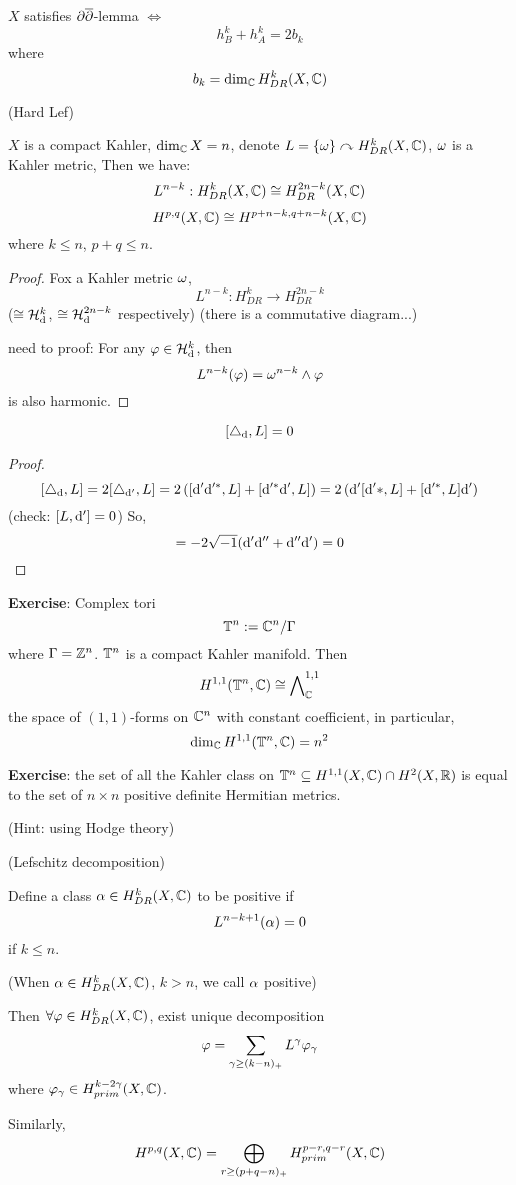 \begin{thm}
$X$ satisfies $\partial\overline{\partial}$-lemma $\iff$
$$h_B^k+h_A^k=2b_k$$
where
$$b_k=\dim_{\mathbb{C}} H_{DR}^k(X,\mathbb{C})$$
\end{thm}

\begin{thm}(Hard Lef)

$X$ is a compact Kahler, $\dim_{\mathbb{C}} X=n$, denote
$L=\{\omega\}\curvearrowright H_{DR}^k(X,\mathbb{C})$, $\omega$ is a Kahler metric,
Then we have:
$$L^{n-k}: H_{DR}^k(X,\mathbb{C})\cong H_{DR}^{2n-k}(X,\mathbb{C})$$
$$H^{p,q}(X,\mathbb{C})\cong H^{p+n-k,q+n-k}(X,\mathbb{C})$$
where $k\leq n$, $p+q\leq n$.
\end{thm}

\begin{proof}Fox a Kahler metric $\omega$,
$$L^{n-k}:H_{DR}^k\to H_{DR}^{2n-k}$$
($\cong \mathcal{H}_{\mathrm{d}}^k$, $\cong\mathcal{H}_{\mathrm{d}}^{2n-k}$ respectively)
(there is a commutative diagram...)

need to proof: For any $\varphi\in\mathcal{H}_{\mathrm{d}}^k$, then
$$L^{n-k}(\varphi)=\omega^{n-k}\wedge\varphi$$
is also harmonic.
\end{proof}

\begin{lemma}
$$[\triangle_{\mathrm{d}},L]=0$$
\end{lemma}

\begin{proof}
$$[\triangle_{\mathrm{d}},L]=2[\triangle_{\mathrm{d}'},L]
=2\left([\mathrm{d}'\mathrm{d}'^*,L]+[\mathrm{d}'^*\mathrm{d}',L]\right)
=2\left(\mathrm{d}'[\mathrm{d}'*,L]+[\mathrm{d}'^*,L]\mathrm{d}'\right)$$
(check: $[L,\mathrm{d}']=0$)
So,
$$=-2\sqrt{-1}(\mathrm{d}'\mathrm{d}''+\mathrm{d}''\mathrm{d}')=0$$
\end{proof}

\textbf{Exercise}: Complex tori
$$\mathbb{T}^n:=\mathbb{C}^n/\Gamma$$
where $\Gamma=\mathbb{Z}^n$. $\mathbb{T}^n$ is a compact Kahler manifold.
Then
$$H^{1,1}(\mathbb{T}^n,\mathbb{C})\cong\bigwedge\nolimits^{1,1}_{\mathbb{C}}$$
the space of $(1,1)$-forms on $\mathbb{C}^n$ with constant coefficient,
in particular,
$$\dim_{\mathbb{C}} H^{1,1}(\mathbb{T}^n,\mathbb{C})=n^2$$

\textbf{Exercise}: the set of all the Kahler class on $\mathbb{T}^n
\subseteq H^{1,1}(X,\mathbb{C})\cap H^2(X,\mathbb{R})$ is equal to
the set of $n\times n$ positive definite Hermitian metrics.

(Hint: using Hodge theory)

\begin{thm}(Lefschitz decomposition)

Define a class $\alpha\in H^{k}_{DR}(X,\mathbb{C})$
to be positive if
$$L^{n-k+1}(\alpha)=0$$
if $k\leq n$.

(When $\alpha\in H^k_{DR}(X,\mathbb{C})$, $k>n$, we call $\alpha$ positive)

Then $\forall\varphi\in H^k_{DR}(X,\mathbb{C})$, exist unique decomposition
$$\varphi=\sum_{\gamma\geq(k-n)_+}
L^\gamma\varphi_\gamma$$
where $\varphi_\gamma\in H_{prim}^{k-2\gamma}(X,\mathbb{C})$.

Similarly,
$$H^{p,q}(X,\mathbb{C})=\bigoplus_{r\geq(p+q-n)_+} H_{prim}^{p-r,q-r}(X,\mathbb{C})$$
\end{thm}

